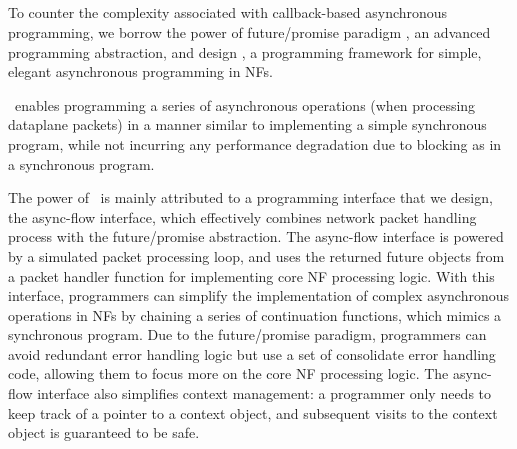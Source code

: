 
\subsection{\netstar}

To counter the complexity associated with callback-based asynchronous programming, we borrow the power of future/promise paradigm \cite{li2007combining, claessen1999poor, wtf}, an advanced programming abstraction, and design \netstar, a programming framework for simple, elegant asynchronous programming in NFs.

\netstar~enables programming a series of asynchronous operations (when processing dataplane packets) in a manner similar to implementing a simple synchronous program, while not incurring any performance degradation due to blocking as in a synchronous program.


The power of \netstar~is mainly attributed to a programming interface that we design, the async-flow interface, which effectively combines network packet handling process with the future/promise abstraction. The async-flow interface is powered by a simulated packet processing loop, and uses the returned future objects from a packet handler function for implementing core NF processing logic. %
 With this interface, programmers can simplify the implementation of complex asynchronous operations in NFs by chaining a series of continuation functions, which mimics a synchronous program. Due to the future/promise paradigm, programmers can avoid redundant error handling logic but use a set of consolidate error handling code, allowing them to focus more on the core NF processing logic. The async-flow interface also simplifies context management: a programmer only needs to keep track of a pointer to a context object, and subsequent visits to the context object is guaranteed to be safe.

